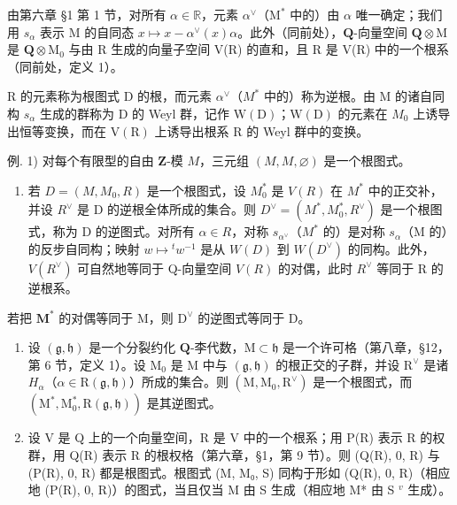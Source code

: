 由第六章 §1 第 1 节，对所有 \(\alpha \in \mathbb{R}\)，元素 \(\alpha^{\vee}\)（\(\mathrm{M}^*\) 中的）由 \(\alpha\) 唯一确定；我们用 \(s_{\alpha}\) 表示 M 的自同态 \(x \mapsto x - \alpha^{\vee}(x)\alpha\)。此外（同前处），\(\mathbf{Q}\)-向量空间 \(\mathbf{Q} \otimes \mathrm{M}\) 是 \(\mathbf{Q} \otimes \mathrm{M}_0\) 与由 R 生成的向量子空间 V(R) 的直和，且 R 是 V(R) 中的一个根系（同前处，定义 1）。

R 的元素称为根图式 D 的根，而元素 \(\alpha^{\vee}\)（\(M^{*}\) 中的）称为逆根。由 M 的诸自同构 \(s_{\alpha}\) 生成的群称为 D 的 Weyl 群，记作 \(\mathrm{W(D)}\)；\(\mathrm{W(D)}\) 的元素在 \(M_{0}\) 上诱导出恒等变换，而在 \(\mathrm{V(R)}\) 上诱导出根系 R 的 Weyl 群中的变换。

例. 1) 对每个有限型的自由 \(\mathbf{Z}\)-模 \(M\)，三元组 \((M, M, \varnothing)\) 是一个根图式。

\begin{enumerate}
\def\labelenumi{\arabic{enumi})}
\setcounter{enumi}{1}
\tightlist
\item
  若 \(D = (M, M_{0}, R)\) 是一个根图式，设 \(M_{0}^{*}\) 是 \(V(R)\) 在 \(M^{*}\) 中的正交补，并设 \(R^{\vee}\) 是 D 的逆根全体所成的集合。则 \(D^{\vee} = (M^{*}, M_{0}^{*}, R^{\vee})\) 是一个根图式，称为 D 的逆图式。对所有 \(\alpha \in R\)，对称 \(s_{\alpha^{\vee}}\)（\(M^{*}\) 的）是对称 \(s_{\alpha}\)（M 的）的反步自同构；映射 \(w \mapsto {}^{t} w^{-1}\) 是从 \(W(D)\) 到 \(W(D^{\vee})\) 的同构。此外，\(V(R^{\vee})\) 可自然地等同于 Q-向量空间 \(V(R)\) 的对偶，此时 \(R^{\vee}\) 等同于 R 的逆根系。
\end{enumerate}

若把 \(\mathbf{M}^*\) 的对偶等同于 M，则 \(\mathrm{D}^{\vee}\) 的逆图式等同于 D。

\begin{enumerate}
\def\labelenumi{\arabic{enumi})}
\setcounter{enumi}{2}
\item
  设 \((\mathfrak{g},\mathfrak{h})\) 是一个分裂约化 \(\mathbf{Q}\)-李代数，\(\mathrm{M} \subset \mathfrak{h}\) 是一个许可格（第八章，§12，第 6 节，定义 1）。设 \(\mathrm{M}_0\) 是 M 中与 \((\mathfrak{g},\mathfrak{h})\) 的根正交的子群，并设 \(\mathrm{R}^\vee\) 是诸 \(H_{\alpha}\)（\(\alpha \in \mathrm{R}(\mathfrak{g},\mathfrak{h})\)）所成的集合。则 \((\mathrm{M},\mathrm{M}_0,\mathrm{R}^\vee)\) 是一个根图式，而 \((\mathrm{M}^*,\mathrm{M}_0^*,\mathrm{R}(\mathfrak{g},\mathfrak{h}))\) 是其逆图式。
\item
  设 V 是 Q 上的一个向量空间，R 是 V 中的一个根系；用 P(R) 表示 R 的权群，用 Q(R) 表示 R 的根权格（第六章，§1，第 9 节）。则 (Q(R), 0, R) 与 (P(R), 0, R) 都是根图式。根图式 (M, M₀, S) 同构于形如 (Q(R), 0, R)（相应地 (P(R), 0, R)）的图式，当且仅当 M 由 S 生成（相应地 M* 由 S \(^{v}\) 生成）。
\end{enumerate}

